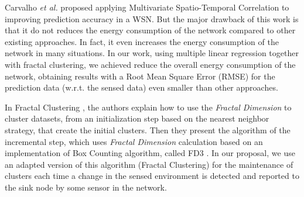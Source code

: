 \documentclass{acm_proc_article-sp}
\begin{document}

Carvalho \textit{et al.} \cite{Carvalho2011} proposed applying Multivariate
Spatio-Temporal Correlation to improving prediction accuracy in a WSN. But the
major drawback of this work is that it do not reduces the energy consumption of
the network compared to other existing approaches. In fact, it even increases
the energy consumption of the network in many situations. In our work, using
multiple linear regression together with fractal clustering, we achieved reduce
the overall energy consumption of the network, obtaining results with a Root
Mean Square Error (RMSE) for the prediction data (w.r.t. the sensed data) even
smaller than other approaches.

In Fractal Clustering \cite{Barbara2000}, the authors explain how to use the
\textit{Fractal Dimension} to cluster datasets, from an initialization step
based on the nearest neighbor strategy, that create the initial clusters. Then
they present the algorithm of the incremental step, which uses \textit{Fractal
Dimension} calculation based on an implementation of Box Counting algorithm,
called FD3 \cite{Liebovitch1989}. In our proposal, we use an adapted version of
this algorithm (Fractal Clustering) for the maintenance of clusters each time a
change in the sensed environment is detected and reported to the sink node by
some sensor in the network.
\end{document}
